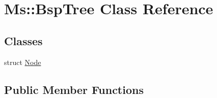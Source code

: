 \hypertarget{class_ms_1_1_bsp_tree}{}\section{Ms\+:\+:Bsp\+Tree Class Reference}
\label{class_ms_1_1_bsp_tree}
\subsection*{Classes}
\begin{DoxyCompactItemize}
\item 
struct \hyperlink{struct_ms_1_1_bsp_tree_1_1_node}{Node}
\end{DoxyCompactItemize}
\subsection*{Public Member Functions}
